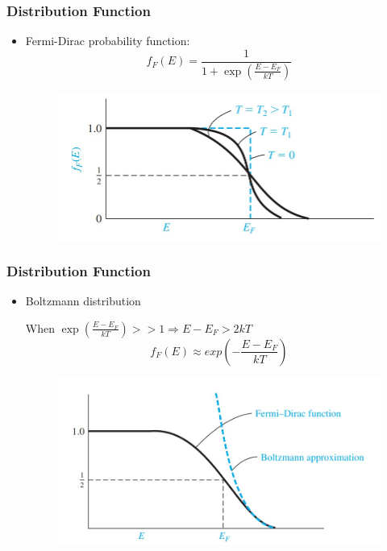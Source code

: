 \documentclass{beamer}
\begin{document}
    \begin{frame} \frametitle{Distribution Function}
        \begin{itemize}
            \item Fermi-Dirac probability function:
                \begin{equation*}
                    f_F(E) = \frac{1}{1 + \exp\left( \frac{E - E_F}{kT}  \right)} 
                \end{equation*}
                \begin{figure}[H]
                    \centering
                    \includegraphics[width=0.8\linewidth]{Fermi-distribution.jpg}
                    \label{fig:Fermi-distribution.jpg}
                \end{figure}
        \end{itemize}
    \end{frame}

    \begin{frame} \frametitle{Distribution Function}
        \begin{itemize}
            \item Boltzmann distribution
                \par When $\exp \left( \frac{E - E_F}{kT} \right) >> 1 \Rightarrow E - E_F > 2kT$
                \begin{equation*}
                    f_F(E) \approx exp\left( -\frac{E - E_F}{kT}  \right)
                \end{equation*}
                \begin{figure}[H]
                    \centering
                    \includegraphics[width=0.8\linewidth]{Boltzmann-distribution.jpg}
                    \label{fig:Boltzmann-distribution.jpg}
                \end{figure}
        \end{itemize}
    \end{frame}
\end{document}
